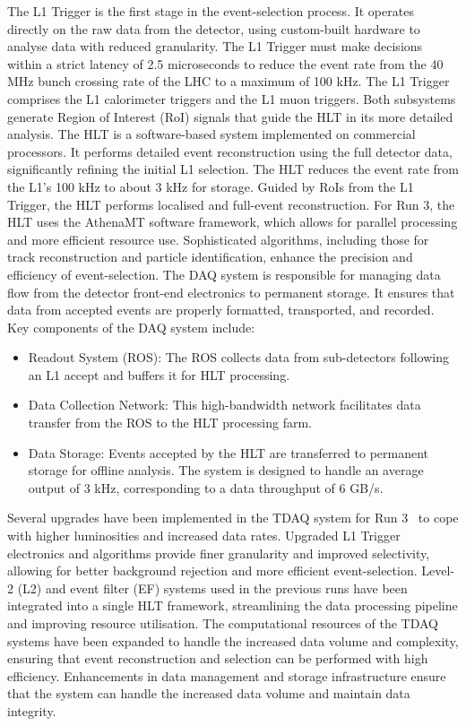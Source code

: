         The L1 Trigger is the first stage in the event-selection process. It operates directly on the raw data 
        from the detector, using custom-built hardware to analyse data with reduced granularity. The L1 Trigger 
        must make decisions within a strict latency of 2.5 microseconds to reduce the event rate from the 40 MHz 
        bunch crossing rate of the LHC to a maximum of 100 kHz. The L1 Trigger comprises the L1 calorimeter 
        triggers and the L1 muon triggers. Both subsystems generate Region of Interest (RoI) signals that guide 
        the HLT in its more detailed analysis.
        The HLT is a software-based system implemented on commercial processors. It performs detailed event 
        reconstruction using the full detector data, significantly refining the initial L1 selection. 
        The HLT reduces the event rate from the L1's 100 kHz to about 3 kHz for storage. Guided by RoIs from 
        the L1 Trigger, the HLT performs localised and full-event reconstruction. For Run 3, the HLT uses the 
        AthenaMT software framework, which allows for parallel processing and more efficient resource use. 
        Sophisticated algorithms, including those for track reconstruction and particle identification, 
        enhance the precision and efficiency of event-selection.
        The DAQ system is responsible for managing data flow from the detector front-end electronics to permanent 
        storage. It ensures that data from accepted events are properly formatted, transported, and recorded.
        Key components of the DAQ system include:
        \begin{itemize}
            \item Readout System (ROS): The ROS collects data from sub-detectors following an L1 accept and 
            buffers it for HLT processing.
            \item Data Collection Network: This high-bandwidth network facilitates data transfer from the 
            ROS to the HLT processing farm.
            \item Data Storage: Events accepted by the HLT are transferred to permanent storage for offline 
            analysis. The system is designed to handle an average output of 3 kHz, corresponding to a data 
            throughput of 6 GB/s.
        \end{itemize}
        Several upgrades have been implemented in the TDAQ system for Run 3~\cite{ATLAS-TDR-23} to cope with higher luminosities 
        and increased data rates. Upgraded L1 Trigger electronics and algorithms provide finer granularity 
        and improved selectivity, allowing for better background rejection and more efficient event-selection.
        Level-2 (L2) and event filter (EF) systems used in the previous runs have been integrated into a 
        single HLT framework, streamlining the data processing pipeline and improving resource utilisation.
        The computational resources of the TDAQ systems have been expanded to handle the increased data 
        volume and complexity, ensuring that event reconstruction and selection can be performed with high 
        efficiency. Enhancements in data management and storage infrastructure ensure that the system can 
        handle the increased data volume and maintain data integrity.
